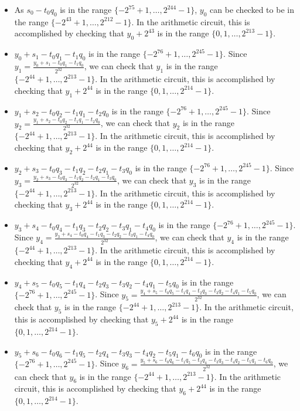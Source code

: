 \documentclass[a4paper, 12pt]{article}
\begin{document}
\begin{itemize}
  \item As $s_0 - t_0q_0$ is in the range $\{-2^{75}+1,\ldots, 2^{244}-1\}$, $y_0$ can be checked to be in the range $\{-2^{43}+1,\ldots, 2^{212}-1\}$. In the arithmetic circuit, this is accomplished by checking that $y_0 + 2^{43}$ is in the range $\{0,1,\ldots,2^{213}-1\}$.
  \item $y_0+s_1-t_0q_1-t_1q_0$ is in the range $\{-2^{76}+1,\ldots, 2^{245}-1\}$. Since $y_1 = \frac{y_0+s_1-t_0q_1-t_1q_0}{2^{32}}$, we can check that $y_1$ is in the range $\{-2^{44}+1,\ldots, 2^{213}-1\}$. In the arithmetic circuit, this is accomplished by checking that $y_1 + 2^{44}$ is in the range $\{0,1,\ldots,2^{214}-1\}$.
  \item $y_1+s_2-t_0q_2-t_1q_1-t_2q_0$ is in the range $\{-2^{76}+1,\ldots, 2^{245}-1\}$. Since $y_2 = \frac{y_1+s_2-t_0q_2-t_1q_1-t_2q_0}{2^{32}}$, we can check that $y_2$ is in the range $\{-2^{44}+1,\ldots, 2^{213}-1\}$. In the arithmetic circuit, this is accomplished by checking that $y_2 + 2^{44}$ is in the range $\{0,1,\ldots,2^{214}-1\}$.
  \item $y_2+s_3-t_0q_3-t_1q_2-t_2q_1-t_3q_0$ is in the range $\{-2^{76}+1,\ldots, 2^{245}-1\}$. Since $y_3 = \frac{y_2+s_3-t_0q_3-t_1q_2-t_2q_1-t_3q_0}{2^{32}}$, we can check that $y_3$ is in the range $\{-2^{44}+1,\ldots, 2^{213}-1\}$. In the arithmetic circuit, this is accomplished by checking that $y_3 + 2^{44}$ is in the range $\{0,1,\ldots,2^{214}-1\}$.
  \item $y_3+s_4-t_0q_4-t_1q_3-t_2q_2-t_3q_1-t_4q_0$ is in the range $\{-2^{76}+1,\ldots, 2^{245}-1\}$. Since $y_4 = \frac{y_3+s_4-t_0q_4-t_1q_3-t_2q_2-t_3q_1-t_4q_0}{2^{32}}$, we can check that $y_4$ is in the range $\{-2^{44}+1,\ldots, 2^{213}-1\}$. In the arithmetic circuit, this is accomplished by checking that $y_4 + 2^{44}$ is in the range $\{0,1,\ldots,2^{214}-1\}$.
  \item $y_4+s_5-t_0q_5-t_1q_4-t_2q_3-t_3q_2-t_4q_1-t_5q_0$ is in the range $\{-2^{76}+1,\ldots, 2^{245}-1\}$. Since $y_5 = \frac{y_4+s_5-t_0q_5-t_1q_4-t_2q_3-t_3q_2-t_4q_1-t_5q_0}{2^{32}}$, we can check that $y_5$ is in the range $\{-2^{44}+1,\ldots, 2^{213}-1\}$. In the arithmetic circuit, this is accomplished by checking that $y_5 + 2^{44}$ is in the range $\{0,1,\ldots,2^{214}-1\}$.
  \item $y_5+s_6-t_0q_6-t_1q_5-t_2q_4-t_3q_3-t_4q_2-t_5q_1-t_6q_0$ is in the range $\{-2^{76}+1,\ldots, 2^{245}-1\}$. Since $y_6 = \frac{y_5+s_6-t_0q_6-t_1q_5-t_2q_4-t_3q_3-t_4q_2-t_5q_1-t_6q_0}{2^{32}}$, we can check that $y_6$ is in the range $\{-2^{44}+1,\ldots, 2^{213}-1\}$. In the arithmetic circuit, this is accomplished by checking that $y_6 + 2^{44}$ is in the range $\{0,1,\ldots,2^{214}-1\}$.

\end{itemize}
\end{document}
